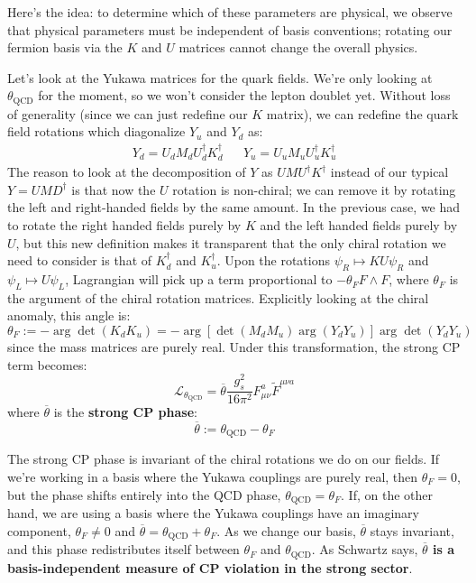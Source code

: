 \documentclass[11pt, oneside]{article}   	%
\theoremstyle{definition}
\begin{document}
Here's the idea: to determine which of these parameters are physical, we observe that physical parameters must be independent of basis conventions; 
rotating our fermion basis via the $K$ and $U$ matrices cannot change the overall physics. 

Let's look at the Yukawa matrices for the quark fields. We're only looking at $\theta_\mathrm{QCD}$ for the moment, so we won't 
consider the lepton doublet yet. Without loss of generality (since we can just redefine our $K$ matrix), we can redefine the quark field rotations 
which diagonalize $Y_u$ and $Y_d$ as:
\begin{align}
	Y_d = U_d M_d U_d^\dagger K_d^\dagger && Y_u = U_u M_u U_u^\dagger K_u^\dagger
\end{align}
The reason to look at the decomposition of $Y$ as $U M U^\dagger K^\dagger$ instead of our typical $Y = U M D^\dagger$ is that now the 
$U$ rotation is non-chiral; we can remove it by rotating the left and right-handed fields by the same amount. In the previous case, we had to 
rotate the right handed fields purely by $K$ and the left handed fields purely by $U$, but this new definition makes it transparent that the 
only chiral rotation we need to consider is that of $K_d^\dagger$ and $K_u^\dagger$. Upon the rotations $\psi_R\mapsto K U\psi_R$ and 
$\psi_L\mapsto U\psi_L$, Lagrangian will pick up a term proportional to $-\theta_F F\wedge F$, where $\theta_F$ is the argument of the 
chiral rotation matrices. Explicitly looking at the chiral anomaly, this angle is:
\begin{equation}
	\theta_F := -\arg\det (K_d K_u) = -\arg[\det(M_d M_u)\arg (Y_d Y_u)] \arg\det(Y_d Y_u)
\end{equation}
since the mass matrices are purely real. Under this transformation, the strong CP term becomes:
\begin{equation}
	\mathcal L_{\theta_\mathrm{QCD}} = \overline\theta \frac{g_s^2}{16\pi^2} F_{\mu\nu}^a \tilde F^{\mu\nu a}
\end{equation}
where $\overline\theta$ is the \textbf{strong CP phase}:
\begin{equation}
	\overline\theta := \theta_\mathrm{QCD} - \theta_F
\end{equation}

The strong CP phase is invariant of the chiral rotations we do on our fields. If we're working in a basis where the Yukawa couplings 
are purely real, then $\theta_F = 0$, but the phase shifts entirely into the QCD phase, $\theta_\mathrm{QCD} = \theta_F$. If, on the other 
hand, we are using a basis where the Yukawa couplings have an imaginary component, $\theta_F\neq 0$ and $\overline\theta = \theta_\mathrm{QCD} 
+ \theta_F$. As we change our basis, $\overline\theta$ stays invariant, and this phase redistributes itself between $\theta_F$ and $\theta_\mathrm{QCD}$. 
As Schwartz says, \textbf{$\overline \theta$ is a basis-independent measure of CP violation in the strong sector}. 
\end{document}
